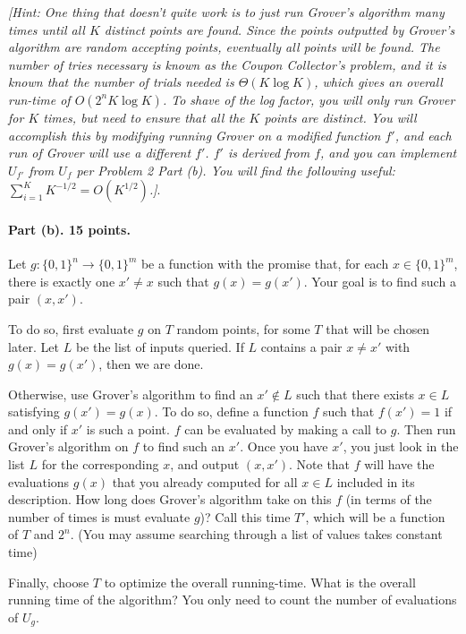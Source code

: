 \documentclass{article}
\begin{document}
\emph{[Hint: One thing that doesn't quite work is to just run Grover's algorithm many times until all $K$ distinct points are found. Since the points outputted by Grover's algorithm are random accepting points, eventually all points will be found. The number of tries necessary is known as the Coupon Collector's problem, and it is known that the number of trials needed is $\Theta(K\log K)$, which gives an overall run-time of $O(2^n K\log K)$. To shave of the log factor, you will only run Grover for $K$ times, but need to ensure that all the $K$ points are distinct. You will accomplish this by modifying running Grover on a modified function $f'$, and each run of Grover will use a different $f'$. $f'$ is derived from $f$, and you can implement $U_{f'}$ from $U_f$ per Problem 2 Part (b). You will find the following useful: $\sum_{i=1}^K K^{-1/2}=O(K^{1/2})$.]}.

\paragraph{Part (b). 15 points.} Let $g:\{0,1\}^n\rightarrow\{0,1\}^m$ be a function with the promise that, for each $x\in\{0,1\}^m$, there is exactly one $x'\neq x$ such that $g(x)=g(x')$. Your goal is to find such a pair $(x,x')$.

To do so, first evaluate $g$ on $T$ random points, for some $T$ that will be chosen later. Let $L$ be the list of inputs queried. If $L$ contains a pair $x\neq x'$ with $g(x)=g(x')$, then we are done.

Otherwise, use Grover's algorithm to find an $x'\notin L$ such that there exists $x\in L$ satisfying $g(x')=g(x)$. To do so, define a function $f$ such that $f(x')=1$ if and only if $x'$ is such a point. $f$ can be evaluated by making a call to $g$. Then run Grover's algorithm on $f$ to find such an $x'$. Once you have $x'$, you just look in the list $L$ for the corresponding $x$, and output $(x,x')$. Note that $f$ will have the evaluations $g(x)$ that you already computed for all $x\in L$ included in its description. How long does Grover's algorithm take on this $f$ (in terms of the number of times is must evaluate $g$)? Call this time $T'$, which will be a function of $T$ and $2^n$. (You may assume searching through a list of values takes constant time)

Finally, choose $T$ to optimize the overall running-time. What is the overall running time of the algorithm? You only need to count the number of evaluations of $U_g$.
\end{document}
